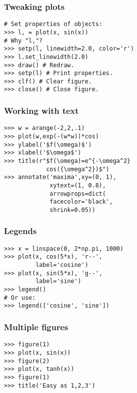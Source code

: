 \documentclass[12pt]{article}
\begin{document}
\subsubsection{Tweaking plots}
\begin{verbatim}
# Set properties of objects:
>>> l, = plot(x, sin(x))
# Why "l,"?
>>> setp(l, linewidth=2.0, color='r')
>>> l.set_linewidth(2.0)
>>> draw() # Redraw.
>>> setp(l) # Print properties.
>>> clf() # Clear figure.
>>> close() # Close figure.
\end{verbatim}

\subsubsection{Working with text}
\begin{verbatim}
>>> w = arange(-2,2,.1)
>>> plot(w,exp(-(w*w))*cos)
>>> ylabel('$f(\omega)$')
>>> xlabel('$\omega$')
>>> title(r"$f(\omega)=e^{-\omega^2}
            cos({\omega^2})$")
>>> annotate('maxima',xy=(0, 1), 
             xytext=(1, 0.8), 
             arrowprops=dict(
             facecolor='black', 
             shrink=0.05))
\end{verbatim}

\subsubsection{Legends}
\begin{verbatim}
>>> x = linspace(0, 2*np.pi, 1000)
>>> plot(x, cos(5*x), 'r--', 
         label='cosine')
>>> plot(x, sin(5*x), 'g--', 
         label='sine')
>>> legend() 
# Or use:
>>> legend(['cosine', 'sine'])
\end{verbatim}

\subsubsection{Multiple figures}
\begin{verbatim}
>>> figure(1)
>>> plot(x, sin(x))
>>> figure(2)
>>> plot(x, tanh(x))
>>> figure(1)
>>> title('Easy as 1,2,3')

\end{verbatim}
\end{document}

